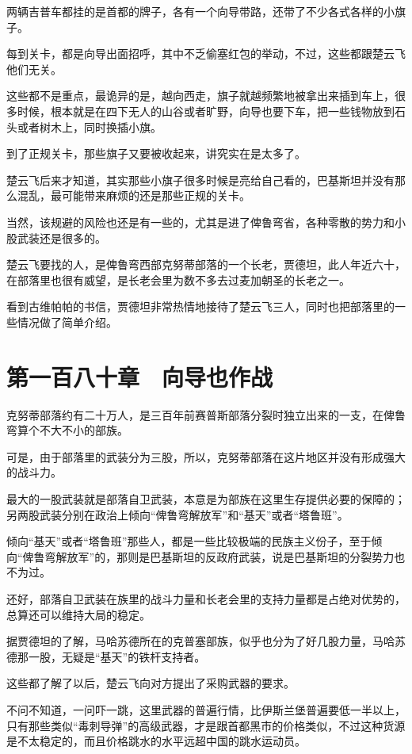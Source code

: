 两辆吉普车都挂的是首都的牌子，各有一个向导带路，还带了不少各式各样的小旗子。

每到关卡，都是向导出面招呼，其中不乏偷塞红包的举动，不过，这些都跟楚云飞他们无关。

这些都不是重点，最诡异的是，越向西走，旗子就越频繁地被拿出来插到车上，很多时候，根本就是在四下无人的山谷或者旷野，向导也要下车，把一些钱物放到石头或者树木上，同时换插小旗。

到了正规关卡，那些旗子又要被收起来，讲究实在是太多了。

楚云飞后来才知道，其实那些小旗子很多时候是亮给自己看的，巴基斯坦并没有那么混乱，最可能带来麻烦的还是那些正规的关卡。

当然，该规避的风险也还是有一些的，尤其是进了俾鲁弯省，各种零散的势力和小股武装还是很多的。

楚云飞要找的人，是俾鲁弯西部克努蒂部落的一个长老，贾德坦，此人年近六十，在部落里也很有威望，是长老会里为数不多去过麦加朝圣的长老之一。

看到古维帕帕的书信，贾德坦非常热情地接待了楚云飞三人，同时也把部落里的一些情况做了简单介绍。

\section{第一百八十章　向导也作战}

克努蒂部落约有二十万人，是三百年前赛普斯部落分裂时独立出来的一支，在俾鲁弯算个不大不小的部族。

可是，由于部落里的武装分为三股，所以，克努蒂部落在这片地区并没有形成强大的战斗力。

最大的一股武装就是部落自卫武装，本意是为部族在这里生存提供必要的保障的；另两股武装分别在政治上倾向“俾鲁弯解放军”和“基天”或者“塔鲁班”。

倾向“基天”或者“塔鲁班”那些人，都是一些比较极端的民族主义份子，至于倾向“俾鲁弯解放军”的，那则是巴基斯坦的反政府武装，说是巴基斯坦的分裂势力也不为过。

还好，部落自卫武装在族里的战斗力量和长老会里的支持力量都是占绝对优势的，总算还可以维持大局的稳定。

据贾德坦的了解，马哈苏德所在的克普塞部族，似乎也分为了好几股力量，马哈苏德那一股，无疑是“基天”的铁杆支持者。

这些都了解了以后，楚云飞向对方提出了采购武器的要求。

不问不知道，一问吓一跳，这里武器的普遍行情，比伊斯兰堡普遍要低一半以上，只有那些类似“毒刺导弹”的高级武器，才是跟首都黑市的价格类似，不过这种货源是不太稳定的，而且价格跳水的水平远超中国的跳水运动员。

